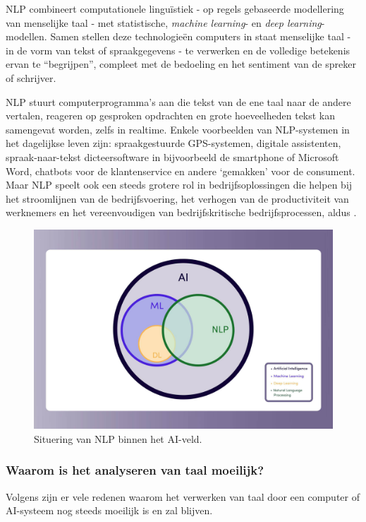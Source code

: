 NLP combineert computationele linguïstiek - op regels gebaseerde modellering van menselijke taal - met statistische, \textit{machine learning}- en \textit{deep learning}-modellen. Samen stellen deze technologieën computers in staat menselijke taal - in de vorm van tekst of spraakgegevens - te verwerken en de volledige betekenis ervan te ``begrijpen'', compleet met de bedoeling en het sentiment van de spreker of schrijver.~\autocite{IBMCloudEducation2021}

NLP stuurt computerprogramma's aan die tekst van de ene taal naar de andere vertalen, reageren op gesproken opdrachten en grote hoeveelheden tekst kan samengevat worden, zelfs in realtime. Enkele voorbeelden van NLP-systemen in het dagelijkse leven zijn: spraakgestuurde GPS-systemen, digitale assistenten, spraak-naar-tekst dicteersoftware in bijvoorbeeld de smartphone of Microsoft Word, chatbots voor de klantenservice en andere `gemakken' voor de consument. Maar NLP speelt ook een steeds grotere rol in bedrijfsoplossingen die helpen bij het stroomlijnen van de bedrijfsvoering, het verhogen van de productiviteit van werknemers en het vereenvoudigen van bedrijfskritische bedrijfsprocessen, aldus \textcite{IBMCloudEducation2021}.

\begin{figure}
    \centering
    \includegraphics[width=.8\textwidth]{./img/nlp_field_ai.jpeg}
    \caption{\label{fig:nlp_field} Situering van NLP binnen het AI-veld.~\autocite{Kleinings2022}}
\end{figure}

\subsubsection{Waarom is het analyseren van taal moeilijk?}
Volgens \textcite{Kleinings2022} zijn er vele redenen waarom het verwerken van taal door een computer of AI-systeem nog steeds moeilijk is en zal blijven.


